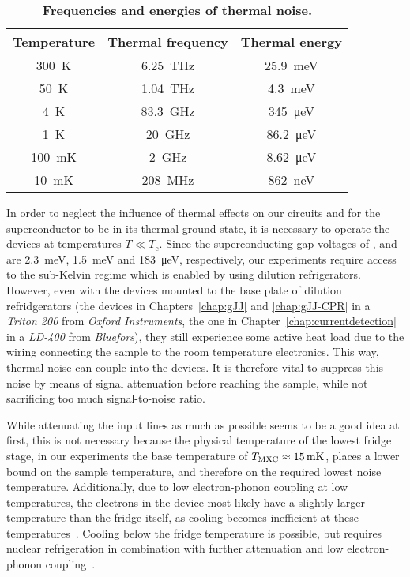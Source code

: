 \begin{table}
	\caption{\textbf{Frequencies and energies of thermal noise.}}
	\label{tab:fthermal}
\begin{tabular}{ccc}
	\hline \hline
	Temperature & Thermal frequency & Thermal energy \\ 
	\hline 
	\SI{300}{\kelvin} & \SI{6.25}{\tera\hertz} & \SI{25.9}{\milli\electronvolt} \\ 
	\SI{50}{\kelvin} & \SI{1.04}{\tera\hertz} & \SI{4.3}{\milli\electronvolt} \\ 
	\SI{4}{\kelvin} & \SI{83.3}{\giga\hertz} & \SI{345}{\micro\electronvolt} \\ 
	\SI{1}{\kelvin} & \SI{20}{\giga\hertz} & \SI{86.2}{\micro\electronvolt} \\ 
	\SI{100}{\milli\kelvin} & \SI{2}{\giga\hertz} & \SI{8.62}{\micro\electronvolt} \\ 
	\SI{10}{\milli\kelvin} & \SI{208}{\mega\hertz} & \SI{862}{\nano\electronvolt} \\ 
	\hline \hline
\end{tabular}
\end{table}

In order to neglect the influence of thermal effects on our circuits and for the superconductor to be in its thermal ground state, it is necessary to operate the devices at temperatures $T \ll T_\text{c}$.
%
Since the superconducting gap voltages of ,  and  are \SI{2.3}{\milli\electronvolt}, \SI{1.5}{\milli\electronvolt} and \SI{183}{\micro\electronvolt}, respectively, our experiments require access to the sub-Kelvin regime which is enabled by using dilution refrigerators.
%
However, even with the devices mounted to the base plate of dilution refridgerators (the devices in Chapters~\ref{chap:gJJ} and \ref{chap:gJJ-CPR} in a \textit{Triton 200} from \textit{Oxford Instruments}, the one in Chapter~\ref{chap:currentdetection} in a \textit{LD-400} from \textit{Bluefors}), they still experience some active heat load due to the wiring connecting the sample to the room temperature electronics.
%
This way, thermal noise can couple into the devices.
%
It is therefore vital to suppress this noise by means of signal attenuation before reaching the sample, while not sacrificing too much signal-to-noise ratio.



While attenuating the input lines as much as possible seems to be a good idea at first, this is not necessary because the physical temperature of the lowest fridge stage, in our experiments the base temperature of $T_{\rm MXC}\approx\SI{15}{\milli\kelvin}$, places a lower bound on the sample temperature, and therefore on the required lowest noise temperature.
%
Additionally, due to low electron-phonon coupling at low temperatures, the electrons in the device most likely have a slightly larger temperature than the fridge itself, as cooling becomes inefficient at these temperatures~\cite{giazottoOpportunitiesMesoscopicsThermometry2006}.
%
Cooling below the fridge temperature is possible, but requires nuclear refrigeration in combination with further attenuation and low electron-phonon coupling~\cite{sarsby500MicrokelvinNanoelectronics2020}.
%

